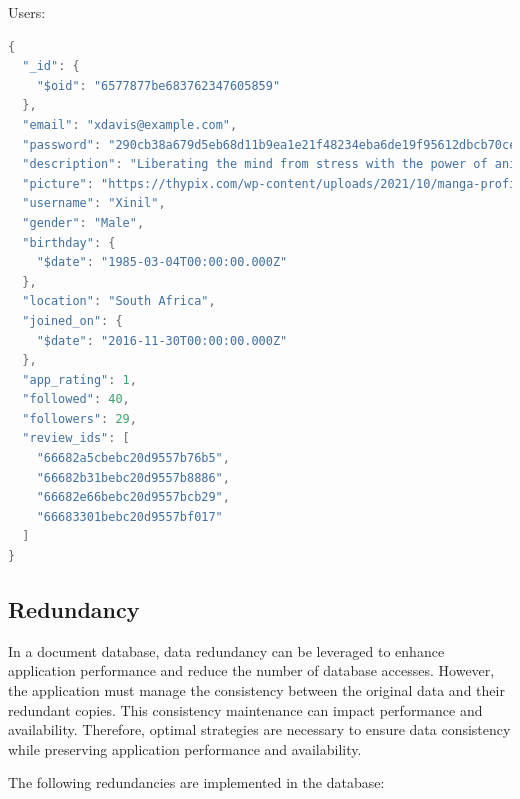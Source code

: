 Users:
\begin{mdframed}[backgroundcolor=yellow!20, innerleftmargin=10pt, innerrightmargin=10pt]
    \begin{lstlisting}[language=java]
      {
  "_id": {
    "$oid": "6577877be683762347605859"
  },
  "email": "xdavis@example.com",
  "password": "290cb38a679d5eb68d11b9ea1e21f48234eba6de19f95612dbcb70ce0c7e4e78",
  "description": "Liberating the mind from stress with the power of anime zen.",
  "picture": "https://thypix.com/wp-content/uploads/2021/10/manga-profile-picture-44.jpg",
  "username": "Xinil",
  "gender": "Male",
  "birthday": {
    "$date": "1985-03-04T00:00:00.000Z"
  },
  "location": "South Africa",
  "joined_on": {
    "$date": "2016-11-30T00:00:00.000Z"
  },
  "app_rating": 1,
  "followed": 40,
  "followers": 29,
  "review_ids": [
    "66682a5cbebc20d9557b76b5",
    "66682b31bebc20d9557b8886",
    "66682e66bebc20d9557bcb29",
    "66683301bebc20d9557bf017"
  ]
}
    \end{lstlisting}
\end{mdframed}

\subsection*{Redundancy}

In a document database, data redundancy can be leveraged to enhance application performance and reduce the
number of database accesses. However, the application must manage the consistency between the original data
and their redundant copies. This consistency maintenance can impact performance and availability. Therefore,
optimal strategies are necessary to ensure data consistency while preserving application performance and availability.

\vspace{\baselineskip}

The following redundancies are implemented in the database:

\vspace{\baselineskip}


